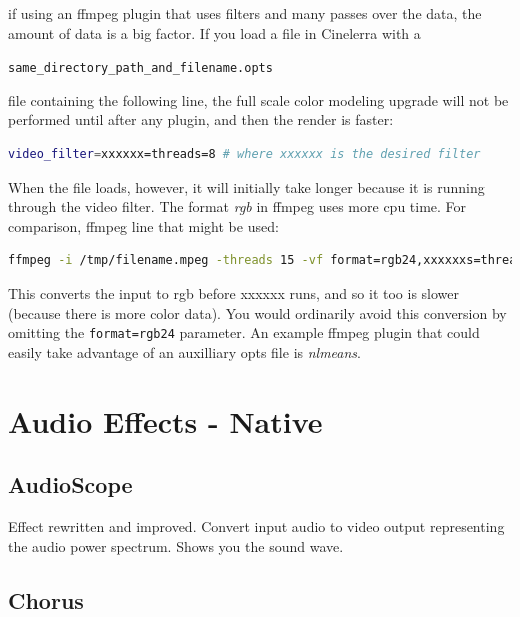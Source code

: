 if using an ffmpeg plugin that uses filters and many passes over the data, the amount of data is a big factor. If you load a file in Cinelerra with a

\texttt{same\_directory\_path\_and\_filename.opts}

file containing the following line, the full scale color modeling upgrade will not be performed until after any plugin, and then the render is faster:

\begin{lstlisting}[language=Bash,numbers=none]
video_filter=xxxxxx=threads=8 # where xxxxxx is the desired filter
\end{lstlisting}

When the file loads, however, it will initially take longer because it is running through the video filter. The format \textit{rgb} in ffmpeg uses more cpu time. For comparison, ffmpeg line that might be used:

\begin{lstlisting}[language=Bash,numbers=none]
ffmpeg -i /tmp/filename.mpeg -threads 15 -vf format=rgb24,xxxxxxs=threads=8 -acodec ac3 -vcodec libx265 - y /tmp/x.mp4
\end{lstlisting}

This converts the input to rgb before xxxxxx runs, and so it too is slower (because there is more color data). You would ordinarily avoid this conversion by omitting the \texttt{format=rgb24} parameter. An example ffmpeg plugin that could easily take advantage of an auxilliary opts file is \textit{nlmeans}.

\section{Audio Effects - Native}%
\label{sec:audio_effects_native}

\subsection{AudioScope}%
\label{sub:audioscope}

Effect rewritten and improved. Convert input audio to video output representing the audio power spectrum. Shows
you the sound wave.

\subsection{Chorus}%
\label{sub:chorus}

